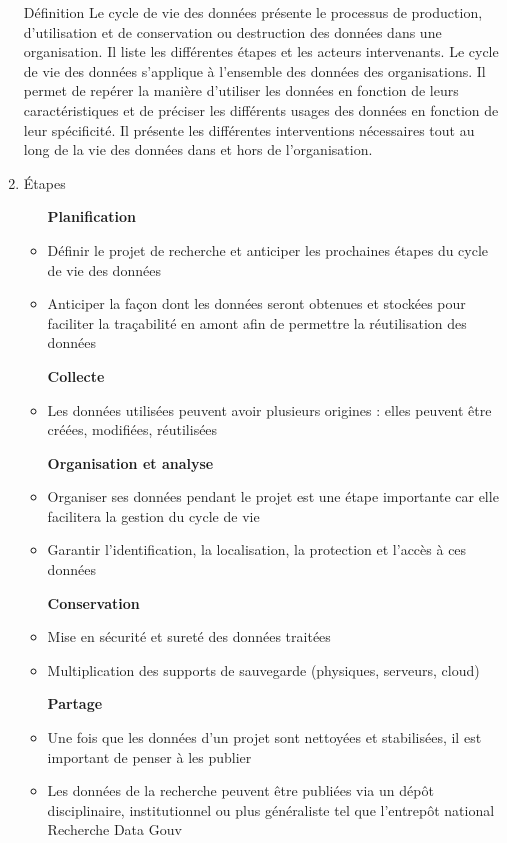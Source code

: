 \documentclass{book}
\begin{document}
\begin{enumerate}
	\item [Définition]
    Le cycle de vie des données présente le processus de production, d’utilisation et de conservation ou destruction des données dans une organisation. Il liste les différentes étapes et les acteurs intervenants.
    Le cycle de vie des données s’applique à l’ensemble des données des organisations. Il permet de repérer la manière d’utiliser les données en fonction de leurs caractéristiques et de préciser les différents usages des données en fonction de leur spécificité. Il présente les différentes interventions nécessaires tout au long de la vie des données dans et hors de l’organisation.
    \item Étapes
        \begin{itemize}
        \item [\textbf{Planification}]
        \item Définir le projet de recherche et anticiper les prochaines étapes du cycle de vie des données
        \item Anticiper la façon dont les données seront obtenues et stockées pour faciliter la traçabilité en amont afin de permettre la réutilisation des données
        \item [\textbf{Collecte}]
        \item Les données utilisées peuvent avoir plusieurs origines : elles peuvent être créées, modifiées, réutilisées
        \item [\textbf{Organisation et analyse}]
        \item Organiser ses données pendant le projet est une étape importante car elle facilitera la gestion du cycle de vie
        \item Garantir l’identification, la localisation, la protection et l’accès à ces données
        \item [\textbf{Conservation}]
        \item Mise en sécurité et sureté des données traitées
        \item Multiplication des supports de sauvegarde (physiques, serveurs, cloud)
        \item[\textbf{Partage}]
        \item Une fois que les données d’un projet sont nettoyées et stabilisées, il est important de penser à les publier
        \item Les données de la recherche peuvent être publiées via un dépôt disciplinaire, institutionnel ou plus généraliste tel que l’entrepôt national Recherche Data Gouv

\end{itemize}
\end{enumerate}
\end{document}
